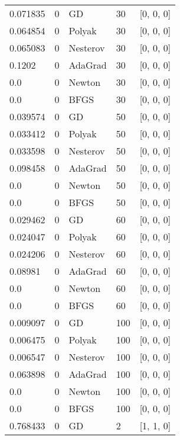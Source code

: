 \begin{tabular}{lllll}
  0.071835 &        0 &       GD &     30 &        [0, 0, 0] \\
  0.064854 &        0 &   Polyak &     30 &        [0, 0, 0] \\
  0.065083 &        0 & Nesterov &     30 &        [0, 0, 0] \\
    0.1202 &        0 &  AdaGrad &     30 &        [0, 0, 0] \\
       0.0 &        0 &   Newton &     30 &        [0, 0, 0] \\
       0.0 &        0 &     BFGS &     30 &        [0, 0, 0] \\
  0.039574 &        0 &       GD &     50 &        [0, 0, 0] \\
  0.033412 &        0 &   Polyak &     50 &        [0, 0, 0] \\
  0.033598 &        0 & Nesterov &     50 &        [0, 0, 0] \\
  0.098458 &        0 &  AdaGrad &     50 &        [0, 0, 0] \\
       0.0 &        0 &   Newton &     50 &        [0, 0, 0] \\
       0.0 &        0 &     BFGS &     50 &        [0, 0, 0] \\
  0.029462 &        0 &       GD &     60 &        [0, 0, 0] \\
  0.024047 &        0 &   Polyak &     60 &        [0, 0, 0] \\
  0.024206 &        0 & Nesterov &     60 &        [0, 0, 0] \\
   0.08981 &        0 &  AdaGrad &     60 &        [0, 0, 0] \\
       0.0 &        0 &   Newton &     60 &        [0, 0, 0] \\
       0.0 &        0 &     BFGS &     60 &        [0, 0, 0] \\
  0.009097 &        0 &       GD &    100 &        [0, 0, 0] \\
  0.006475 &        0 &   Polyak &    100 &        [0, 0, 0] \\
  0.006547 &        0 & Nesterov &    100 &        [0, 0, 0] \\
  0.063898 &        0 &  AdaGrad &    100 &        [0, 0, 0] \\
       0.0 &        0 &   Newton &    100 &        [0, 0, 0] \\
       0.0 &        0 &     BFGS &    100 &        [0, 0, 0] \\
  0.768433 &        0 &       GD &      2 &        [1, 1, 0] \\

\end{tabular}
